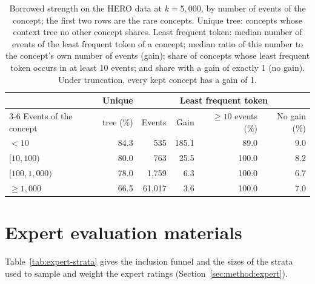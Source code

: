 \begin{table}[t]
\centering
\small
\setlength{\tabcolsep}{4pt}
\begin{tabular}{@{}lrrrrr@{}}
\toprule
 & Unique & \multicolumn{4}{c}{Least frequent token} \\
\cmidrule(l){3-6}
Events of the concept & tree (\%) & Events & Gain & $\ge 10$ events (\%) & No gain (\%) \\
\midrule
$< 10$ & 84.3 & 535 & 185.1 & 89.0 & 9.0 \\
$[10, 100)$ & 80.0 & 763 & 25.5 & 100.0 & 8.2 \\
$[100, 1{,}000)$ & 78.0 & 1,759 & 6.3 & 100.0 & 6.7 \\
$\ge 1{,}000$ & 66.5 & 61,017 & 3.6 & 100.0 & 7.0 \\
\bottomrule
\end{tabular}
\caption{Borrowed strength on the HERO data at $k = 5{,}000$, by number of events of the concept; the first two rows are the rare concepts.
Unique tree: concepts whose context tree no other concept shares.
Least frequent token: median number of events of the least frequent token of a concept; median ratio of this number to the concept's own number of events (gain); share of concepts whose least frequent token occurs in at least 10 events; and share with a gain of exactly 1 (no gain).
Under truncation, every kept concept has a gain of 1.}
\label{tab:longtail}
\end{table}

\section{Expert evaluation materials}
\label{app:expert}

Table~\ref{tab:expert-strata} gives the inclusion funnel and the sizes of the strata used to sample and weight the expert ratings (Section~\ref{sec:method:expert}).

